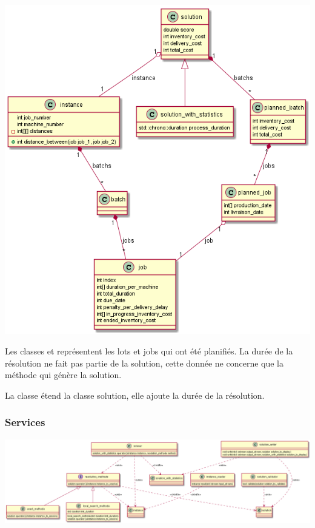 \includegraphics[width=\textwidth]{parts/analyse_et_conception/diagramme_data}

Les classes  et  représentent les lots et jobs qui ont été planifiés.
La durée de la résolution ne fait pas partie de la solution,  cette donnée ne concerne que la méthode qui génère la solution.

La classe  étend la classe solution, 
elle ajoute la durée de la résolution.

\subsubsection{Services}

\includegraphics[width=\textwidth]{parts/analyse_et_conception/services}



